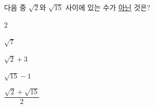 다음 중 $\sqrt{2}$와 $\sqrt{15}$ 사이에 있는 수가 \underline{아닌} 것은?
\begin{choices32}{\rule[-3ex]{0pt}{8ex}$2$}{\rule[-3ex]{0pt}{8ex}$\sqrt{7}$}{\rule[-3ex]{0pt}{8ex}$\sqrt{2}+3$}{\rule[-3ex]{0pt}{8ex}$\sqrt{15}-1$}{\rule[-3ex]{0pt}{8ex}$\dfrac{\sqrt{2}+\sqrt{15}}{2}$}\end{choices32}
